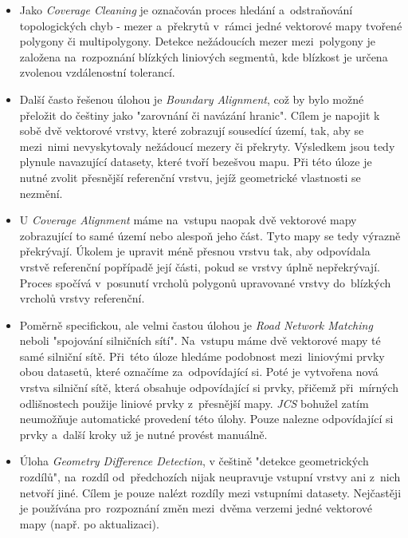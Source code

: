 \begin{itemize}[leftmargin=*]
 \item Jako \textit{Coverage Cleaning} je  označován proces hledání a~odstraňování topologických chyb - mezer a~překrytů v~rámci jedné vektorové mapy tvořené polygony či 
	multipolygony. Detekce nežádoucích mezer mezi~polygony je založena na~rozpoznání blízkých liniových segmentů, kde blízkost je určena zvolenou vzdálenostní tolerancí. 

 \item Další často řešenou úlohou je \textit{Boundary Alignment}, což by bylo možné přeložit do češtiny jako "zarovnání či navázání hranic". Cílem je napojit k sobě dvě 
	vektorové vrstvy, které zobrazují sousedící území, tak, aby se mezi~nimi nevyskytovaly nežádoucí mezery či překryty. Výsledkem jsou tedy plynule navazující datasety,
	které tvoří bezešvou mapu. Při této úloze je nutné zvolit přesnější referenční vrstvu, jejíž geometrické vlastnosti se nezmění.

 \item U \textit{Coverage Alignment} máme na~vstupu naopak dvě vektorové mapy zobrazující to samé území nebo alespoň jeho část. Tyto mapy se tedy výrazně překrývají. Úkolem
	je upravit méně přesnou vrstvu tak, aby odpovídala vrstvě referenční popřípadě její části, pokud se vrstvy úplně nepřekrývají. Proces spočívá v~posunutí vrcholů
	polygonů upravované vrstvy do~blízkých vrcholů vrstvy referenční.

 \item Poměrně specifickou, ale velmi častou úlohou je \textit{Road Network Matching} neboli "spojování silničních sítí". Na~vstupu máme dvě vektorové mapy té samé silniční
	sítě. Při~této úloze hledáme podobnost mezi~liniovými prvky obou datasetů, které označíme za~odpovídající si. Poté je vytvořena nová vrstva silniční sítě, která
	obsahuje odpovídající si prvky, přičemž při~mírných odlišnostech použije liniové prvky z~přesnější mapy. \textit{JCS} bohužel zatím neumožňuje automatické provedení
	této úlohy. Pouze nalezne odpovídající si prvky a~další kroky už je nutné provést manuálně.

\item Úloha \textit{Geometry Difference Detection}, v češtině "detekce geometrických rozdílů", na~rozdíl od~předchozích nijak neupravuje vstupní vrstvy ani z~nich netvoří jiné.
	Cílem je pouze nalézt rozdíly mezi vstupními datasety. Nejčastěji je používána pro~rozpoznání změn mezi~dvěma verzemi jedné vektorové mapy (např. po aktualizaci).
\end{itemize}

